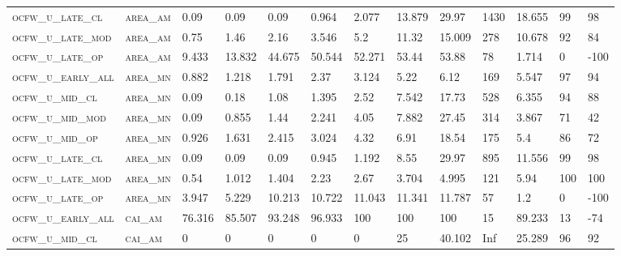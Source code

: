 \begin{landscape}
\begin{center}
\begin{footnotesize}
\begin{longtable}{lllllllllllll}
\textsc{ocfw\_u\_late\_cl  } & \textsc{area\_am  }   & 0.09     & 0.09     & 0.09     & 0.964    & 2.077    & 13.879   & 29.97     & 1430   & 18.655        & 99            & 98       \\
\textsc{ocfw\_u\_late\_mod } & \textsc{area\_am  }   & 0.75     & 1.46     & 2.16     & 3.546    & 5.2      & 11.32    & 15.009    & 278    & 10.678        & 92            & 84       \\
\textsc{ocfw\_u\_late\_op  } & \textsc{area\_am  }   & 9.433    & 13.832   & 44.675   & 50.544   & 52.271   & 53.44    & 53.88     & 78     & 1.714         & 0             & -100     \\
\textsc{ocfw\_u\_early\_all} & \textsc{area\_mn  }   & 0.882    & 1.218    & 1.791    & 2.37     & 3.124    & 5.22     & 6.12      & 169    & 5.547         & 97            & 94       \\
\textsc{ocfw\_u\_mid\_cl   } & \textsc{area\_mn  }   & 0.09     & 0.18     & 1.08     & 1.395    & 2.52     & 7.542    & 17.73     & 528    & 6.355         & 94            & 88       \\
\textsc{ocfw\_u\_mid\_mod  } & \textsc{area\_mn  }   & 0.09     & 0.855    & 1.44     & 2.241    & 4.05     & 7.882    & 27.45     & 314    & 3.867         & 71            & 42       \\
\textsc{ocfw\_u\_mid\_op   } & \textsc{area\_mn  }   & 0.926    & 1.631    & 2.415    & 3.024    & 4.32     & 6.91     & 18.54     & 175    & 5.4           & 86            & 72       \\
\textsc{ocfw\_u\_late\_cl  } & \textsc{area\_mn  }   & 0.09     & 0.09     & 0.09     & 0.945    & 1.192    & 8.55     & 29.97     & 895    & 11.556        & 99            & 98       \\
\textsc{ocfw\_u\_late\_mod } & \textsc{area\_mn  }   & 0.54     & 1.012    & 1.404    & 2.23     & 2.67     & 3.704    & 4.995     & 121    & 5.94          & 100           & 100      \\
\textsc{ocfw\_u\_late\_op  } & \textsc{area\_mn  }   & 3.947    & 5.229    & 10.213   & 10.722   & 11.043   & 11.341   & 11.787    & 57     & 1.2           & 0             & -100     \\
\textsc{ocfw\_u\_early\_all} & \textsc{cai\_am   }   & 76.316   & 85.507   & 93.248   & 96.933   & 100      & 100      & 100       & 15     & 89.233        & 13            & -74      \\
\textsc{ocfw\_u\_mid\_cl   } & \textsc{cai\_am   }   & 0        & 0        & 0        & 0        & 0        & 25       & 40.102    & Inf    & 25.289        & 96            & 92       \\

\end{longtable}
\end{footnotesize}
\end{center}
\end{landscape}
